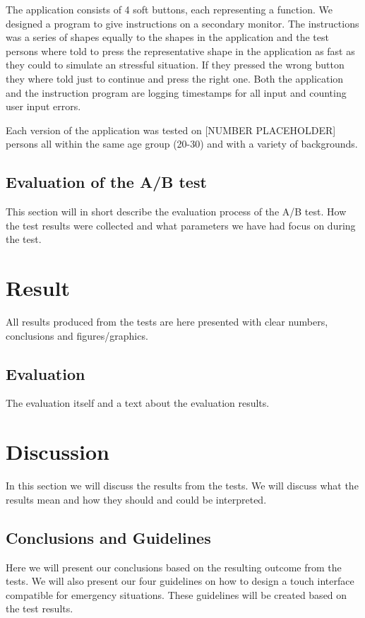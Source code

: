 \documentclass[runningheads,a4paper,oribibl]{llncs}
\begin{document}
The application consists of 4 soft buttons, each representing a function. We designed a program to give instructions on a secondary monitor. The instructions was a series of shapes equally to the shapes in the application and the test persons where told to press the representative shape in the application as fast as they could to simulate an stressful situation. If they pressed the wrong button they where told just to continue and press the right one. Both the application and the instruction program are logging timestamps for all input and counting user input errors.

Each version of the application was tested on [NUMBER PLACEHOLDER] persons all within the same age group (20-30) and with a variety of backgrounds.

\subsection{Evaluation of the A/B test}
This section will in short describe the evaluation process of the A/B test. How the test results were collected and what parameters we have had focus on during the test.

\section{Result}
All results produced from the tests are here presented with clear numbers, conclusions and figures/graphics.

\subsection{Evaluation}
The evaluation itself and a text about the evaluation results.

\section{Discussion}
In this section we will discuss the results from the tests. We will discuss what the results mean and how they should and could be interpreted.

\subsection{Conclusions and Guidelines}
Here we will present our conclusions based on the resulting outcome from the tests. We will also present our four guidelines on how to design a touch interface compatible for emergency situations. These guidelines will be created based on the test results.
\end{document}
